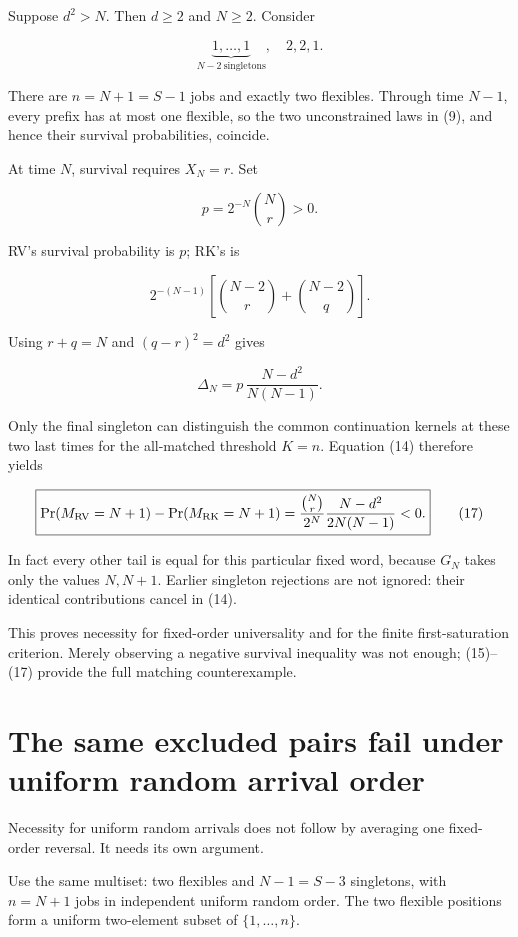 Suppose \(d^2>N\). Then \(d\ge 2\) and \(N\ge 2\). Consider

\[
\underbrace{1,\ldots,1}_{N-2\ \mathrm{singletons}},\quad 2,2,1.\tag{15}
\]

There are \(n=N+1=S-1\) jobs and exactly two flexibles. Through time \(N-1\), every prefix has at most one flexible, so the two unconstrained laws in (9), and hence their survival probabilities, coincide.

At time \(N\), survival requires \(X_N=r\). Set

\[
p=2^{-N}\binom Nr>0.
\]

RV's survival probability is \(p\); RK's is

\[
2^{-(N-1)}\left[\binom{N-2}{r}+\binom{N-2}{q}\right].
\]

Using \(r+q=N\) and \((q-r)^2=d^2\) gives

\[
\Delta_N=p\,\frac{N-d^2}{N(N-1)}.\tag{16}
\]

Only the final singleton can distinguish the common continuation kernels at these two last times for the all-matched threshold \(K=n\). Equation (14) therefore yields

\[
\boxed{
\Pr(M_{\rm RV}=N+1)-\Pr(M_{\rm RK}=N+1)
=
\frac{\binom Nr}{2^N}\frac{N-d^2}{2N(N-1)}<0.
}\tag{17}
\]

In fact every other tail is equal for this particular fixed word, because \(G_N\) takes only the values \(N,N+1\). Earlier singleton rejections are not ignored: their identical contributions cancel in (14).

This proves necessity for fixed-order universality and for the finite first-saturation criterion. Merely observing a negative survival inequality was not enough; (15)--(17) provide the full matching counterexample.

\section{The same excluded pairs fail under uniform random arrival order}\label{the-same-excluded-pairs-fail-under-uniform-random-arrival-order}

Necessity for uniform random arrivals does not follow by averaging one fixed-order reversal. It needs its own argument.

Use the same multiset: two flexibles and \(N-1=S-3\) singletons, with \(n=N+1\) jobs in independent uniform random order. The two flexible positions form a uniform two-element subset of \(\{1,\ldots,n\}\).

